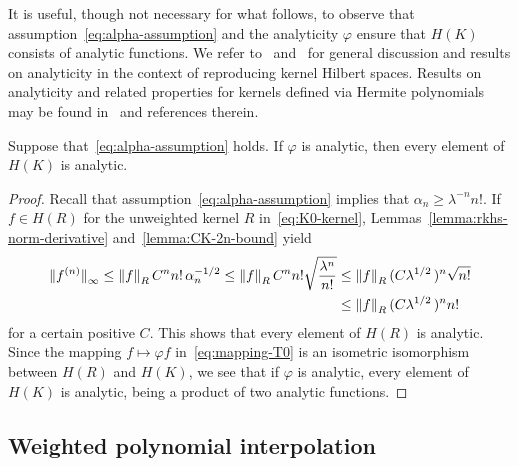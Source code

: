 \documentclass{mcom-l}
\numberwithin{equation}{section}
\numberwithin{theorem}{section} %
\begin{document}
It is useful, though not necessary for what follows, to observe that assumption~\eqref{eq:alpha-assumption} and the analyticity $\varphi$ ensure that $H(K)$ consists of analytic functions.
We refer to~\cite[pp.\@~40--43]{Saitoh1997} and~\cite{SunZhou2008} for general discussion and results on analyticity in the context of reproducing kernel Hilbert spaces.
Results on analyticity and related properties for kernels defined via Hermite polynomials may be found in~\cite[Sec.\@~3.1]{Gnewuch2022} and references therein.

\begin{proposition} \label{prop:analytic}
  Suppose that~\eqref{eq:alpha-assumption} holds.
  If $\varphi$ is analytic, then every element of $H(K)$ is analytic.
\end{proposition}
\begin{proof}
  Recall that assumption~\eqref{eq:alpha-assumption} implies that $\alpha_n \geq \lambda^{-n} n!$.
  If $f \in H(R)$ for the unweighted kernel $R$ in~\eqref{eq:K0-kernel}, Lemmas~\ref{lemma:rkhs-norm-derivative} and~\ref{lemma:CK-2n-bound} yield
  \begin{equation*}
    \begin{split}
      \norm[0]{f^{(n)}}_\infty \leq \norm[0]{f}_{R} C^n n! \, \alpha_n^{-1/2} \leq \norm[0]{f}_{R} C^n n! \sqrt{ \frac{ \lambda^n }{n!}} &\leq \norm[0]{f}_{R} (C \lambda^{1/2} \, )^n \sqrt{n!} \\
      &\leq \norm[0]{f}_{R} (C \lambda^{1/2} \, )^n n!
      \end{split}
  \end{equation*}
  for a certain positive $C$.
  This shows that every element of $H(R)$ is analytic.
  Since the mapping $f \mapsto \varphi f$ in~\eqref{eq:mapping-T0} is an isometric isomorphism between $H(R)$ and $H(K)$, we see that if $\varphi$ is analytic, every element of $H(K)$ is analytic, being a product of two analytic functions.
\end{proof}

\subsection{Weighted polynomial interpolation}
\end{document}

